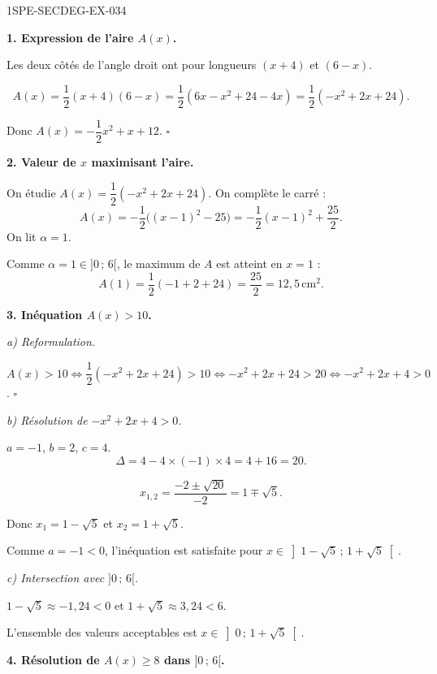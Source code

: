 \begin{corrige}{1SPE-SECDEG-EX-034}

\textbf{1. Expression de l'aire $A(x)$.}


Les deux côtés de l'angle droit ont pour longueurs $(x+4)$ et $(6-x)$.

\[A(x) = \frac{1}{2}(x+4)(6-x) = \frac{1}{2}(6x - x^2 + 24 - 4x) = \frac{1}{2}(-x^2 + 2x + 24).\]

Donc $A(x) = -\dfrac{1}{2}x^2 + x + 12$. \hfill $\square$

\medskip
\textbf{2. Valeur de $x$ maximisant l'aire.}


On étudie $A(x) = \dfrac{1}{2}(-x^2 + 2x + 24)$. On complète le carré :
\[A(x)=-\frac{1}{2}\bigl((x-1)^2-25\bigr)=-\frac{1}{2}(x-1)^2+\frac{25}{2}.\]
On lit $\alpha=1$.

Comme $\alpha = 1 \in ]0\,;\,6[$, le maximum de $A$ est atteint en $x = 1$ :
\[A(1) = \frac{1}{2}(-1 + 2 + 24) = \frac{25}{2} = 12{,}5\,\text{cm}^2.\]

\medskip
\textbf{3. Inéquation $A(x) > 10$.}

\textit{a) Reformulation.}


$A(x) > 10 \iff \dfrac{1}{2}(-x^2 + 2x + 24) > 10 \iff -x^2 + 2x + 24 > 20 \iff -x^2 + 2x + 4 > 0$. \hfill $\square$

\textit{b) Résolution de $-x^2 + 2x + 4 > 0$.}

$a = -1$, $b = 2$, $c = 4$.
\[\Delta = 4 - 4 \times (-1) \times 4 = 4 + 16 = 20.\]

\[x_{1,2} = \frac{-2 \pm \sqrt{20}}{-2} = 1 \mp \sqrt{5}.\]

Donc $x_1 = 1 - \sqrt{5}$ et $x_2 = 1 + \sqrt{5}$.

Comme $a = -1 < 0$, l'inéquation est satisfaite pour $x \in \left]1 - \sqrt{5}\,;\,1 + \sqrt{5}\right[$.

\textit{c) Intersection avec $]0\,;\,6[$.}

$1 - \sqrt{5} \approx -1{,}24 < 0$ et $1 + \sqrt{5} \approx 3{,}24 < 6$.

L'ensemble des valeurs acceptables est $x \in \left]0\,;\,1 + \sqrt{5}\right[$.

\medskip
\textbf{4. Résolution de $A(x) \geqslant 8$ dans $]0\,;\,6[$.}


\end{corrige}
